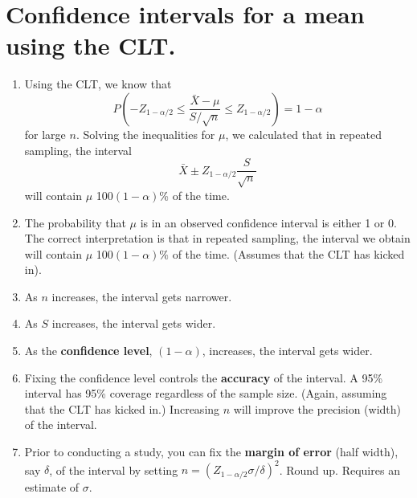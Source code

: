 \documentclass[12pt]{article}
\begin{document}
\section{Confidence intervals for a mean using the CLT.}
\begin{enumerate}[1.]
\item Using the CLT, we know that 
$$
P\left(-Z_{1 - \alpha / 2} \leq \frac{\bar X - \mu}{S / \sqrt n} \leq Z_{1 - \alpha / 2}\right)
 = 1 - \alpha
$$
for large $n$. Solving the inequalities for $\mu$, we calculated that in repeated
sampling, the interval
$$
\bar X \pm Z_{1 - \alpha / 2} \frac{S}{\sqrt{n}}
$$
will contain $\mu$ 100$(1-\alpha)$\% of the time.
\item The probability that $\mu$ is in an observed confidence interval is either 1 or 0. 
  The correct interpretation is that in repeated sampling, the interval we obtain
  will contain $\mu$ 100$(1 - \alpha)\%$ of the time. (Assumes that the CLT has kicked in).
\item As $n$ increases, the interval gets narrower.
\item As $S$ increases, the interval gets wider.
\item As the {\bf confidence level}, $(1-\alpha)$, increases, the interval gets wider.
\item Fixing the confidence level controls the {\bf accuracy} of the
  interval. A 95\% interval has 95\% coverage regardless of the sample
  size. (Again, assuming that the CLT has kicked in.) Increasing $n$
  will improve the precision (width) of the interval.
\item Prior to conducting a study, you can fix the {\bf margin of
    error} (half width), say $\delta$, of the interval by setting $n =
  (Z_{1 - \alpha / 2} \sigma / \delta)^2$. Round up. Requires an estimate of $\sigma$.
\end{enumerate}
\end{document}
